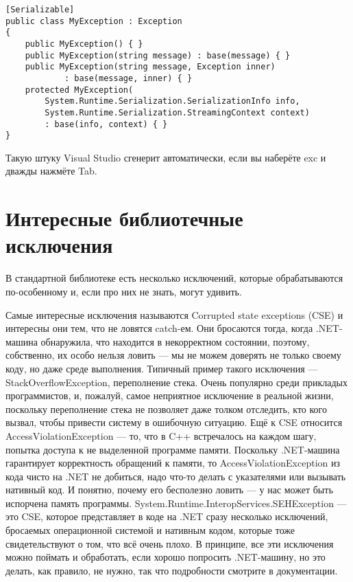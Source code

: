 \documentclass{../../text-style}
\begin{document}
\begin{verbatim}
[Serializable]
public class MyException : Exception
{
    public MyException() { }
    public MyException(string message) : base(message) { }
    public MyException(string message, Exception inner) 
            : base(message, inner) { }
    protected MyException(
        System.Runtime.Serialization.SerializationInfo info,
        System.Runtime.Serialization.StreamingContext context)
        : base(info, context) { }
}
\end{verbatim}

Такую штуку Visual Studio сгенерит автоматически, если вы наберёте exc и дважды нажмёте Tab.

\section{Интересные библиотечные исключения}

В стандартной библиотеке есть несколько исключений, которые обрабатываются по-особенному и, если про них не знать, могут удивить. 

Самые интересные исключения называются Corrupted state exceptions (CSE) и интересны они тем, что не ловятся catch-ем. Они бросаются тогда, когда .NET-машина обнаружила, что находится в некорректном состоянии, поэтому, собственно, их особо нельзя ловить --- мы не можем доверять не только своему коду, но даже среде выполнения. Типичный пример такого исключения --- StackOverflowException, переполнение стека. Очень популярно среди прикладых программистов, и, пожалуй, самое неприятное исключение в реальной жизни, поскольку переполнение стека не позволяет даже толком отследить, кто кого вызвал, чтобы привести систему в ошибочную ситуацию. Ещё к CSE относится AccessViolationException --- то, что в C++ встречалось на каждом шагу, попытка доступа к не выделенной программе памяти. Поскольку .NET-машина гарантирует корректность обращений к памяти, то AccessViolationException из кода чисто на .NET не добиться, надо что-то делать с указателями или вызывать нативный код. И понятно, почему его бесполезно ловить --- у нас может быть испорчена память программы. System.Runtime.InteropServices.SEHException --- это CSE, которое представляет в коде на .NET сразу несколько исключений, бросаемых операционной системой и нативным кодом, которые тоже свидетельствуют о том, что всё очень плохо. В принципе, все эти исключения можно поймать и обработать, если хорошо попросить .NET-машину, но это делать, как правило, не нужно, так что подробности смотрите в документации.
\end{document}
